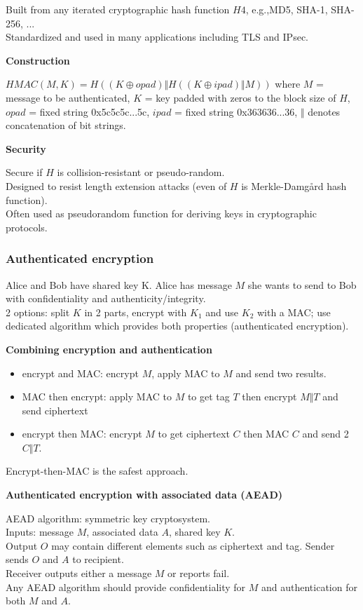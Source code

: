 \documentclass{article}
\begin{document}
Built from any iterated cryptographic hash function $H4$, e.g.,MD5, SHA-1, SHA-256, ...\\
Standardized and used in many applications including TLS and IPsec.

\textbf{Construction}

$HMAC(M,K) = H((K \oplus opad) \Vert H (( K \oplus ipad) \Vert M))$ where $M$ = message to be authenticated, $K$ = key padded with zeros to the block size of $H$, $opad$ = fixed string 0x5c5c5c...5c, $ipad$ = fixed string 0x363636...36, $\Vert$ denotes concatenation of bit strings.

\textbf{Security}

Secure if $H$ is collision-resistant or pseudo-random.\\
Designed to resist length extension attacks (even of $H$ is Merkle-Damgård hash function).\\
Often used as pseudorandom function for deriving keys in cryptographic protocols.

\subsubsection{Authenticated encryption}

Alice and Bob have shared key K. Alice has message $M$ she wants to send to Bob with confidentiality and authenticity/integrity.\\
2 options: split $K$ in 2 parts, encrypt with $K_1$ and use $K_2$ with a MAC; use dedicated algorithm which provides both properties (authenticated encryption).

\textbf{Combining encryption and authentication}

\begin{itemize}
    \item encrypt and MAC: encrypt $M$, apply MAC to $M$ and send two results.
    \item MAC then encrypt: apply MAC to $M$ to get tag $T$ then encrypt $M \Vert T$ and send ciphertext
    \item encrypt then MAC: encrypt $M$ to get ciphertext $C$ then MAC $C$ and send 2 $C \Vert T$.
\end{itemize}

Encrypt-then-MAC is the safest approach.

\textbf{Authenticated encryption with associated data (AEAD)}

AEAD algorithm: symmetric key cryptosystem.\\
Inputs: message $M$, associated data $A$, shared key $K$.\\
Output $O$ may contain different elements such as ciphertext and tag. Sender sends $O$ and $A$ to recipient.\\
Receiver outputs either a message $M$ or reports fail.\\
Any AEAD algorithm should provide confidentiality for $M$ and authentication for both $M$ and $A$.
\end{document}
